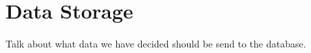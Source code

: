 \section{Data Storage} \label{sec:data_store}
Talk about what data we have decided should be send to the database.